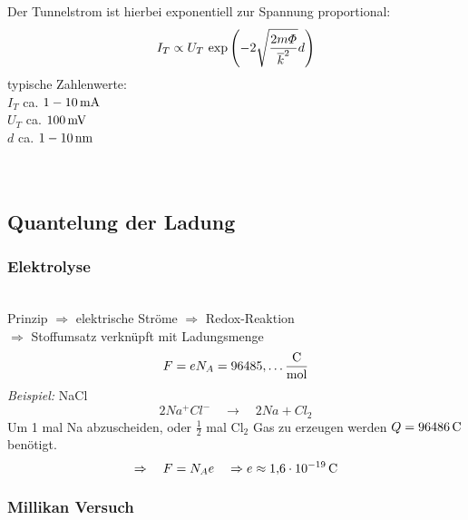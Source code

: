 Der Tunnelstrom ist hierbei exponentiell zur Spannung proportional:
\begin{equation*}
I_T \propto U_T \textrm{ exp}\left(- 2\sqrt{\frac{2 m \varPhi}{\overline{k}^2}} d \right)
\end{equation*}
typische Zahlenwerte:\\
$ I_T $ ca. $ 1 - 10 \, \textrm{mA} $\\
$ U_T $ ca. $ 100 \, \textrm{mV} $\\
$ d $ ca. $ 1 - 10 \, \textrm{nm} $\\
\\
\\


\subsection{Quantelung der Ladung}

\subsubsection{Elektrolyse}

\\
Prinzip $ \Rightarrow $ elektrische Ströme $ \Rightarrow $ Redox-Reaktion\\
$ \Rightarrow $ Stoffumsatz verknüpft mit Ladungsmenge
\begin{equation*}
F = e N_A = 96485{,}\dots \frac{\textrm{C}}{\textrm{mol}}
\end{equation*}
\emph{Beispiel:} NaCl
\begin{equation*}
2 Na^+ Cl^- \quad \rightarrow \quad 2 Na + Cl_2
\end{equation*}
Um 1 mal Na abzuscheiden, oder $ \frac{1}{2} $ mal Cl$ _2 $ Gas zu erzeugen werden $ Q = 96486 \, \textrm{C} $ benötigt.
\begin{equation*}
\Rightarrow \quad F = N_A e \quad \Rightarrow e \approx 1{,}6 \cdot 10^{-19} \, \textrm{C} 
\end{equation*}

\subsubsection{Millikan Versuch}

